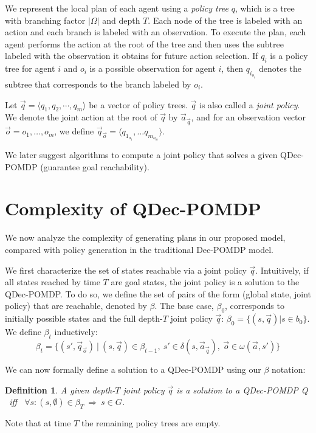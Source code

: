 \documentclass[letterpaper]{article}
\newtheorem{definition}{Definition}
\theoremstyle{definition}
\begin{document}
We represent the local plan of each agent using a \emph{policy tree} $q$, which is a tree with branching factor $|\Omega|$ and depth $T$.  Each node of the tree is labeled with an action and each branch is labeled with an observation.  To execute the plan, each agent performs the action at the root of the tree and then uses the subtree labeled with the observation it obtains for future action selection.
If $q_i$ is a policy tree for agent $i$ and $o_i$ is a possible observation for agent $i$, then $q_{i_{o_i}}$ denotes the subtree that corresponds to the branch labeled by $o_i$.

Let $\vec{q} = \langle  q_1, q_2, \cdots, q_m \rangle$ be a vector of policy trees.  $\vec{q}$ is also called a {\em joint policy}.
We denote the joint action at the root of $\vec{q}$ by $\vec{a}_{\vec{q}}$, and for an observation vector
$\vec{o}=o_1,\ldots, o_m$, we define $\vec{q}_{\vec{o}}= \langle  q_{1_{o_1}},\ldots q_{m_{o_m}}\rangle$.

We later suggest algorithms to compute a joint policy that solves a given QDec-POMDP (guarantee goal reachability).

\section{Complexity of QDec-POMDP}

We now analyze the complexity of generating plans in our proposed model, compared with policy generation in the traditional Dec-POMDP model.

We first characterize the set of states reachable via a joint policy $\vec{q}$. Intuitively, if all states reached by time $T$ are goal states,
the joint policy is a solution to the QDec-POMDP.  To do so, we define the set of pairs of the form (global state, joint policy) that are reachable, denoted by $\beta$.
The base case, $\beta_0$, corresponds to initially possible states and the full depth-$T$ joint policy $\vec{q}$: $\beta_0 = \{(s,\vec{q}) | s \in b_0\}$.  We define $\beta_{t}$ inductively:
\begin{equation} \nonumber
  \beta_{t} = \{ (s', \vec{q}_{\vec{o}}) ~|~
 (s,\vec{q}) \in \beta_{t-1}, ~s' \in \delta(s,\vec{a}_{\vec{q}}), ~\vec{o} \in \omega(\vec{a},s') \}
 \label{eq:bu}
\end{equation}



We can now formally define a solution to a QDec-POMDP using our $\beta$ notation:
\begin{definition}
A given depth-$T$ joint policy $\vec{q}$ is a solution to a QDec-POMDP {\cal Q} ~iff~
$\forall s : (s,\emptyset) \in \beta_T ~\Rightarrow~ s \in G$.
\end{definition}
\noindent Note that at time $T$ the remaining policy trees are empty.
\end{document}
